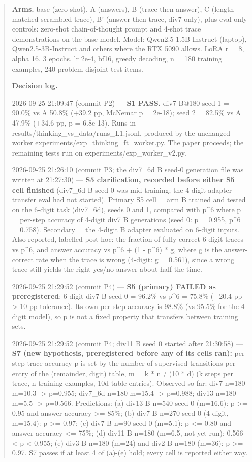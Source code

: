 \documentclass{article}
\theoremstyle{definition}
\begin{document}
\begin{small}
\begin{quote}
\textbf{Arms.} base (zero-shot), A (answers), B (trace then answer), C (length-matched scrambled trace), B' (answer then trace, div7 only), plus eval-only controls: zero-shot chain-of-thought prompt and 4-shot trace demonstrations on the base model. Model: Qwen2.5-1.5B-Instruct (laptop), Qwen2.5-3B-Instruct and others where the RTX 5090 allows. LoRA r = 8, alpha 16, 3 epochs, lr 2e-4, bf16, greedy decoding, n = 180 training examples, 240 problem-disjoint test items.

\textbf{Decision log.}

2026-09-25 21:09:47 (commit P2) --- \textbf{S1 PASS.} div7 B@180 seed 1 = 90.0\% vs A 50.8\% (+39.2 pp, McNemar p = 2e-18); seed 2 = 82.5\% vs A 47.9\% (+34.6 pp, p = 6.8e-13). Runs in results/thinking\_vs\_data/runs\_L1.jsonl, produced by the unchanged worker experiments/exp\_thinking\_ft\_worker.py. The paper proceeds; the remaining tests run on experiments/exp\_worker\_v2.py.

2026-09-25 21:26:10 (commit P3; the div7\_6d B seed-0 generation file was written at 21:27:30) --- \textbf{S5 clarification, recorded before either S5 cell finished} (div7\_6d B seed 0 was mid-training; the 4-digit-adapter transfer eval had not started). Primary S5 cell = arm B trained and tested on the 6-digit task (div7\_6d), seeds 0 and 1, compared with p\textasciicircum 6 where p = per-step accuracy of 4-digit div7 B generations (seed 0: p = 0.955, p\textasciicircum 6 = 0.758). Secondary = the 4-digit B adapter evaluated on 6-digit inputs. Also reported, labelled post hoc: the fraction of fully correct 6-digit traces vs p\textasciicircum 6, and answer accuracy vs p\textasciicircum 6 + (1 - p\textasciicircum 6) * g, where g is the answer-correct rate when the trace is wrong (4-digit: g = 0.561), since a wrong trace still yields the right yes/no answer about half the time.

2026-09-25 21:29:52 (commit P4) --- \textbf{S5 (primary) FAILED as preregistered}: 6-digit div7 B seed 0 = 96.2\% vs p\textasciicircum 6 = 75.8\% (+20.4 pp > 10 pp tolerance). Its own per-step accuracy is 98.8\% (vs 95.5\% for the 4-digit model), so p is not a fixed property that transfers between training sets.

2026-09-25 21:29:52 (commit P4; div11 B seed 0 started after 21:30:58) --- \textbf{S7 (new hypothesis, preregistered before any of its cells ran):} per-step trace accuracy p is set by the number of supervised transitions per entry of the (remainder, digit) table, m = k * n / (10 * d) (k steps per trace, n training examples, 10d table entries). Observed so far: div7 n=180 m=10.3 -> p=0.955; div7\_6d n=180 m=15.4 -> p=0.988; div13 n=180 m=5.5 -> p=0.566. Predictions: (a) div13 B n=540 seed 0 (m=16.6): p >= 0.95 and answer accuracy >= 85\%; (b) div7 B n=270 seed 0 (4-digit, m=15.4): p >= 0.97; (c) div7 B n=90 seed 0 (m=5.1): p <= 0.80 and answer accuracy <= 75\%; (d) div11 B n=180 (m=6.5, not yet run): 0.566 < p < 0.955; (e) div3 B n=180 (m=24) and div2 B n=180 (m=36): p >= 0.97. S7 passes if at least 4 of (a)-(e) hold; every cell is reported either way.


\end{quote}
\end{small}
\end{document}
